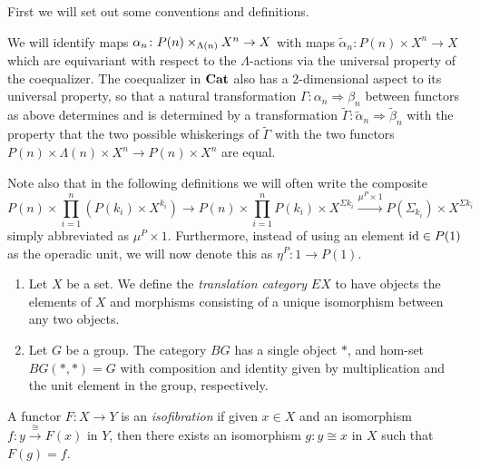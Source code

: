 First we will set out some conventions and definitions.
\begin{conv}\label{conv_coeq}
We will identify maps $\alpha_n \colon P(n) \times_{\Lambda(n)} X^{n} \rightarrow X$ with maps $\tilde{\alpha}_n \colon P(n) \times X^n \rightarrow X$ which are equivariant with respect to the $\Lambda$-actions via the universal property of the coequalizer. The coequalizer in $\mathbf{Cat}$ also has a $2$-dimensional aspect to its universal property, so that a natural transformation $\Gamma \colon \alpha_{n} \Rightarrow \beta_{n}$ between functors as above determines and is determined by a transformation $\tilde{\Gamma} \colon \tilde{\alpha}_{n} \Rightarrow \tilde{\beta}_{n}$ with the property that the two possible whiskerings of $\tilde{\Gamma}$ with the two functors $P(n) \times \Lambda(n) \times X^{n} \rightarrow P(n) \times X^{n}$ are equal.

Note also that in the following definitions we will often write the composite
    \[
        P(n) \times \prod_{i=1}^n \left(P(k_i) \times X^{k_i}\right) \rightarrow P(n) \times \prod_{i=1}^n P(k_i) \times X^{\Sigma k_i} \xrightarrow{\mu^P \times 1} P(\Sigma_{k_i}) \times X^{\Sigma k_i}
    \]
simply abbreviated as $\mu^P \times 1$. Furthermore, instead of using an element $\textrm{id} \in P(1)$ as the operadic unit, we will now denote this as $\eta^{P} \colon 1 \rightarrow P(1)$.
\end{conv}

\begin{Defi}\label{Defi:e_b}
  \begin{enumerate}
    \item Let $X$ be a set. We define the \textit{translation category} $EX$ to have objects the elements of $X$ and morphisms consisting of a unique isomorphism between any two objects.
    \item Let $G$ be a group. The category $BG$ has a single object $*$, and hom-set $BG(*,*) = G$ with composition and identity given by multiplication and the unit element in the group, respectively.
  \end{enumerate}
\end{Defi}

\begin{Defi}
A functor $F \colon X \rightarrow Y$ is an \emph{isofibration} if given $x \in X$ and an isomorphism $f\colon y \xrightarrow{\cong} F(x)$ in $Y$, then there exists an isomorphism $g \colon y \cong x$ in $X$ such that $F(g) = f$.
\end{Defi}

